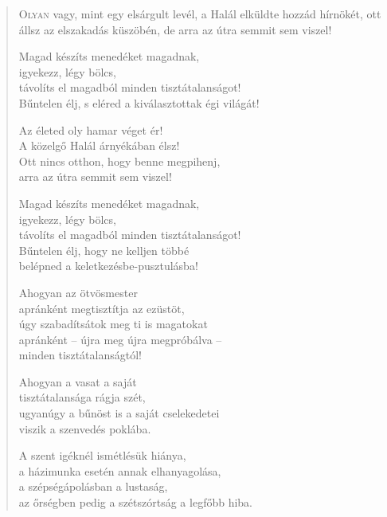 
\vspace*{-\baselineskip}
\begin{verse}

{\par%
\lettrine{O}{lyan} {\LettrineTextFont vagy, mint egy elsárgult levél,}\newline
a Halál elküldte hozzád hírnökét,\newline
ott állsz az elszakadás küszöbén,\verselinebreak
de arra az útra semmit sem viszel!
\par}

 Magad készíts menedéket magadnak,\\
igyekezz, légy bölcs,\\
távolíts el magadból minden tisztátalanságot!\\
Bűntelen élj, s eléred a kiválasztottak égi világát!

 Az életed oly hamar véget ér!\\
A közelgő Halál árnyékában élsz!\\
Ott nincs otthon, hogy benne megpihenj,\\
arra az útra semmit sem viszel!

 Magad készíts menedéket magadnak,\\
igyekezz, légy bölcs,\\
távolíts el magadból minden tisztátalanságot!\\
Bűntelen élj, hogy ne kelljen többé\\
belépned a keletkezésbe-pusztulásba!

 Ahogyan az ötvösmester\\
apránként megtisztítja az ezüstöt,\\
úgy szabadítsátok meg ti is magatokat\\
apránként – újra meg újra megpróbálva –\\
minden tisztátalanságtól!

 Ahogyan a vasat a saját\\
tisztátalansága rágja szét,\\
ugyanúgy a bűnöst is a saját cselekedetei\\
viszik a szenvedés poklába.

 A szent igéknél ismétlésük hiánya,\\
a házimunka esetén annak elhanyagolása,\\
a szépségápolásban a lustaság,\\
az őrségben pedig a szétszórtság a legfőbb hiba.


\end{verse}

